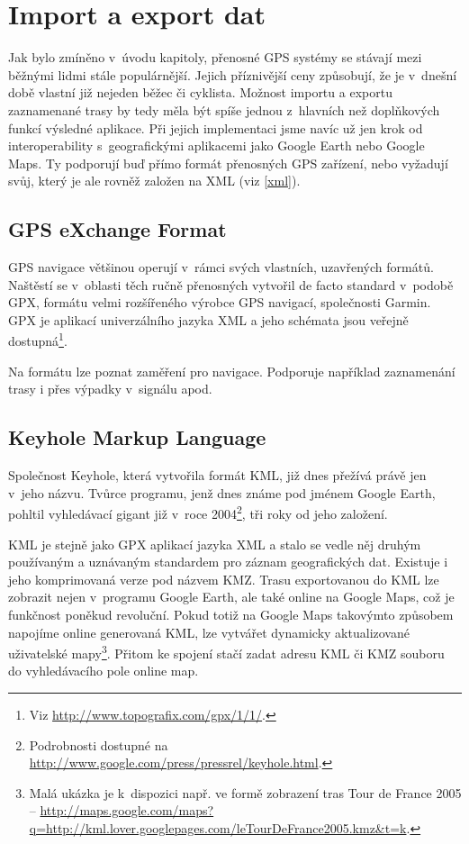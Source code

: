 \section{Import a export dat}\label{importExport}
Jak bylo zmíněno v~úvodu kapitoly, přenosné GPS systémy se stávají
mezi běžnými lidmi stále populárnější. Jejich příznivější ceny
způsobují, že je v~dnešní době vlastní již nejeden běžec či cyklista.
Možnost importu a exportu zaznamenané trasy by tedy měla být spíše
jednou z~hlavních než doplňkových funkcí výsledné aplikace. Při
jejich implementaci jsme navíc už jen krok od interoperability
s~geografickými aplikacemi jako Google Earth nebo Google Maps. Ty
podporují buď přímo formát přenosných GPS zařízení, nebo vyžadují
svůj, který je ale rovněž založen na XML (viz \ref{xml}).

\subsection{GPS eXchange Format}
GPS navigace většinou operují v~rámci svých vlastních, uzavřených
formátů. Naštěstí se v~oblasti těch ručně přenosných vytvořil de
facto standard v~podobě GPX, formátu velmi rozšířeného výrobce GPS
navigací, společnosti Garmin. GPX je aplikací univerzálního jazyka
XML a jeho schémata jsou veřejně dostupná\footnote{Viz
\url{http://www.topografix.com/gpx/1/1/}.}.

Na formátu lze poznat zaměření pro navigace. Podporuje například
zaznamenání trasy i přes výpadky v~signálu apod.

\subsection{Keyhole Markup Language}
Společnost Keyhole, která vytvořila formát KML, již dnes přežívá
právě jen v~jeho názvu. Tvůrce programu, jenž dnes známe pod jménem
Google Earth, pohltil vyhledávací gigant již v~roce
2004\footnote{Podrobnosti dostupné na
\url{http://www.google.com/press/pressrel/keyhole.html}.}, tři roky od
jeho založení.

KML je stejně jako GPX aplikací jazyka XML a stalo se vedle něj
druhým používaným a uznávaným standardem pro záznam geografických
dat. Existuje i jeho komprimovaná verze pod názvem KMZ. Trasu
exportovanou do KML lze zobrazit nejen v~programu Google Earth, ale
také online na Google Maps, což je funkčnost poněkud revoluční. Pokud
totiž na Google Maps takovýmto způsobem napojíme online generovaná
KML, lze vytvářet dy\-na\-mic\-ky aktualizované uživatelské
mapy\footnote{Malá ukázka je k~dispozici např. ve formě zobrazení tras Tour de France
2005 --
\url{http://maps.google.com/maps?q=http://kml.lover.googlepages.com/leTourDeFrance2005.kmz&t=k}.}.
Přitom ke spojení stačí zadat adresu KML či KMZ souboru do vyhledávacího pole online map.


